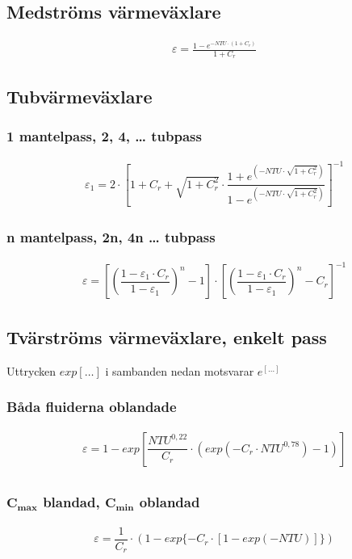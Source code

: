 	\subsection*{Medströms värmeväxlare}
	\begin{align*}
		& \varepsilon = \frac{1 - e^{-NTU \cdot (1 + C_r)}}{1 + C_r} 
	\end{align*}
	\subsection*{Tubvärmeväxlare}
	\subsubsection*{1 mantelpass, 2, 4, … tubpass}
	\begin{align*}
		& \varepsilon_1 = 2 \cdot \left[ 1 + C_r + \sqrt{1+C_r^2} \cdot \dfrac{1+e^{(-NTU \cdot \sqrt{1+C_r^2})}}{1-e^{(-NTU \cdot \sqrt{1+C_r^2})}}\right]^{-1}
	\end{align*}
	\subsubsection*{n mantelpass, 2n, 4n … tubpass}
	\begin{align*}
		& \varepsilon = \left[ \left(\dfrac{1- \varepsilon_1 \cdot C_r}{1 - \varepsilon_1} \right)^n - 1\right] \cdot \left[ \left(\dfrac{1- \varepsilon_1 \cdot C_r}{1 - \varepsilon_1} \right)^n - C_r\right]^{-1}
	\end{align*}
	\subsection*{Tvärströms värmeväxlare, enkelt pass}
	Uttrycken $exp[\dots]$ i sambanden nedan motsvarar $e^{[\dots]}$
	\subsubsection*{Båda fluiderna oblandade}
	\begin{align*}
		& \varepsilon = 1 - exp\left[{\dfrac{NTU^{0,22}}{C_r} \cdot \left(exp{(-C_r \cdot NTU^{0,78})} -1 \right)}\right] \\
	\end{align*}
	\subsubsection*{$\mathbf{C_{max}}$ blandad, $\mathbf{C_{min}}$ oblandad}
	\begin{align*}
	& \varepsilon = \dfrac{1}{C_r} \cdot ( 1- exp\{ -C_r \cdot [1 - exp(-NTU)]\})
	\end{align*}
